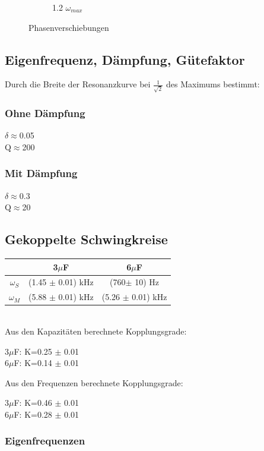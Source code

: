 \documentclass{article}
\begin{document}
\begin{figure}
\begin{subfigure}{0.3\textwidth}
\caption{1.2 $\omega_{max}$}
\end{subfigure}
\caption{Phasenverschiebungen}
\end{figure}

\subsection*{Eigenfrequenz, Dämpfung, Gütefaktor}
Durch die Breite der Resonanzkurve bei $\frac{1}{\sqrt{2}}$ des Maximums bestimmt:
\subsubsection*{Ohne Dämpfung}
$\delta \approx$0.05\\
Q$\approx$200
\subsubsection*{Mit Dämpfung}
$\delta \approx$0.3\\
Q$\approx$20
\subsection{Gekoppelte Schwingkreise}

\begin{tabular}{c|c|c}
&3$\mu$F & 6$\mu$F \\
\hline $\omega_S$ & (1.45 $\pm$ 0.01) kHz & (760$\pm$ 10) Hz\\
$\omega_M$ & (5.88 $\pm$ 0.01) kHz & (5.26 $\pm$ 0.01) kHz\\
\end{tabular}\\

Aus den Kapazitäten berechnete Kopplungsgrade:\\
\begin{center}
3$\mu$F: K=0.25 $\pm$ 0.01 \\
6$\mu$F: K=0.14 $\pm$ 0.01
\end{center}
Aus den Frequenzen berechnete Kopplungsgrade:\\
\begin{center}
3$\mu$F: K=0.46 $\pm$ 0.01 \\
6$\mu$F: K=0.28 $\pm$ 0.01
\end{center}
\subsubsection*{Eigenfrequenzen}
\end{document}
